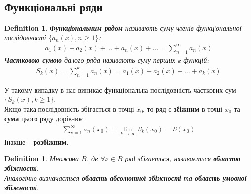 \documentclass[a4paper, 10pt]{article}
\def\huge{\displaystyle}
\theoremstyle{theoremdd}
\theoremstyle{theoremdd}
\theoremstyle{theoremdd}
\newtheorem{definition}[theorem]{Definition}
\theoremstyle{theoremdd}
\theoremstyle{theoremdd}
\theoremstyle{theoremdd}
\theoremstyle{theoremdd}
\theoremstyle{theoremdd}
\theoremstyle{theoremdd}
\begin{document}
\subsection{Функціональні ряди}
\begin{definition}
\textbf{Функціональним рядом} називають суму членів функціональної послідовності $\{a_n(x), n \geq 1\}$:
\begin{align*}
a_1(x) + a_2(x) + \dots + a_n(x) + \dots = \huge \sum_{n=1}^\infty a_n(x)
\end{align*}
\textbf{Частковою сумою} даного ряда називають суму перших $k$ функцій:
\begin{align*}
S_k(x) = \sum_{n=1}^k a_n(x) = a_1(x) + a_2(x) + \dots + a_k(x)
\end{align*}
\end{definition}

У такому випадку в нас виникає функціональна послідовність часткових сум $\{S_k(x), k \geq 1\}$.\\
Якщо така послідовність збігається в точці $x_0$, то ряд є \textbf{збіжним} в точці $x_0$ та \textbf{сума} цього ряду дорівнює
\begin{align*}
\sum_{n=1}^\infty a_n(x_0) = \lim_{k \to \infty} S_k(x_0) = S(x_0)
\end{align*}
Інакше -- \textbf{розбіжним}.

\begin{definition}
Множина $B$, де $\forall x \in B$ ряд збігається, називається \textbf{областю збіжності}.\\ Аналогічно визначається \textbf{область абсолютної збіжності} та \textbf{область умовної збіжності}.
\end{definition}
\end{document}
